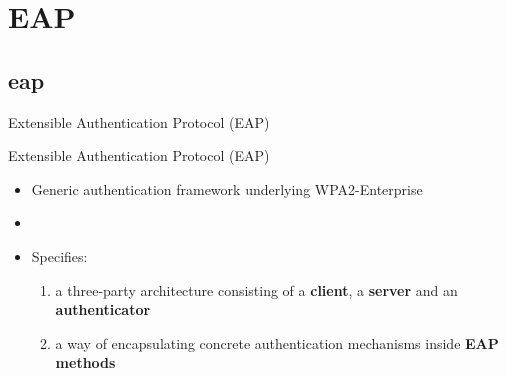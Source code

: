 \documentclass[xcolor={dvipsnames},screen, aspectratio=43,compress]{beamer}
\makeatletter
\let\beamer@writeslidentry@miniframeson=\beamer@writeslidentry
\def\beamer@writeslidentry@miniframesoff{%
  \expandafter\beamer@ifempty\expandafter{\beamer@framestartpage}{}%
  {%
    \clearpage\beamer@notesactions%
  }
}
\newcommand*{\miniframeson}{\let\beamer@writeslidentry=\beamer@writeslidentry@miniframeson}
\newcommand*{\miniframesoff}{\let\beamer@writeslidentry=\beamer@writeslidentry@miniframesoff}
\makeatother
\begin{document}
\section{EAP}
\subsection{eap}


\miniframesoff
\begin{frame}
	
	\vfill
	\vfill
	\vfill
	\centering
	Extensible Authentication Protocol (EAP)
	\vfill
	\vfill
	\vfill
\end{frame}
\miniframeson


\begin{frame}{Extensible Authentication Protocol (EAP)}
	\begin{itemize}
		\item Generic authentication framework underlying WPA2-Enterprise
		
		\item[]
		
		\item<2-> Specifies:
		
		\begin{enumerate}
			\item<2-> a three-party architecture consisting of a \textbf{client}, a \textbf{server} and an \textbf{authenticator}

		
			\item<3-> a way of encapsulating concrete authentication mechanisms inside \textbf{EAP methods}
			
			\vspace*{0.2cm}
\end{enumerate}
\end{itemize}
\end{frame}
\end{document}
